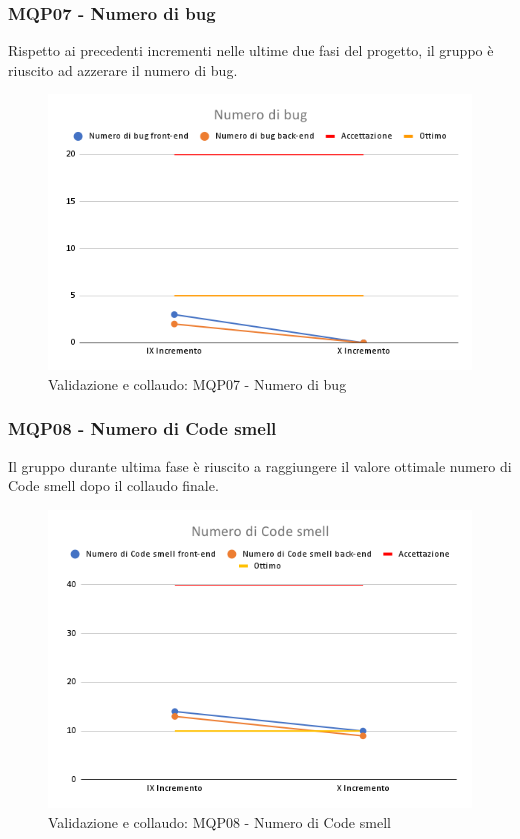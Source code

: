 \subsubsection{MQP07 - Numero di bug}
Rispetto ai precedenti incrementi nelle ultime due fasi del progetto, il gruppo è riuscito ad azzerare il numero di bug.
\begin{figure}[H]
    \centering
    \includegraphics[scale=0.50]{Sezioni/images/last_prodotto/Numero_di_bug.png}
    \caption{Validazione e collaudo: MQP07 - Numero di bug}
\end{figure}
\subsubsection{MQP08 - Numero di Code smell}
Il gruppo durante ultima fase è riuscito a raggiungere il valore ottimale numero di Code smell dopo il collaudo finale.
\begin{figure}[H]
    \centering
    \includegraphics[scale=0.50]{Sezioni/images/last_prodotto/Numero_di_Code_smell.png}
    \caption{Validazione e collaudo: MQP08 - Numero di Code smell}
\end{figure}
